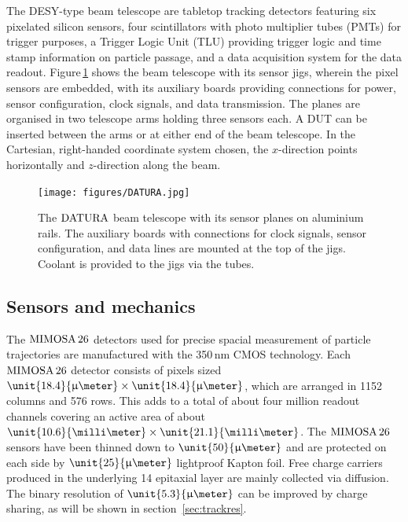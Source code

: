 
The DESY-type beam telescope are tabletop tracking detectors featuring six pixelated silicon sensors, four scintillators with photo multiplier tubes (PMTs) for trigger purposes,
 a Trigger Logic Unit (TLU) providing trigger logic and time stamp information on particle passage, and a data acquisition system for the data readout. 
Figure\,\ref{fig:datura-tscope} shows the beam telescope with its sensor jigs, wherein the pixel sensors are embedded, with its auxiliary boards providing connections for power,
 sensor configuration, clock signals, and data transmission. 
The planes are organised in two telescope arms holding three sensors each. 
A DUT can be inserted between the arms or at either end of the beam telescope. 
In the Cartesian, right-handed coordinate system chosen, the $x$-direction points horizontally and $z$-direction along the beam.

\begin{figure}[tb]
	\center
	\texttt{[image: figures/DATURA.jpg]}
	\caption[The $\Datura$ telescope]{The $\Datura$ beam telescope with its sensor planes on aluminium rails.
	The auxiliary boards with connections for clock signals, sensor configuration, and data lines are mounted at the top of the jigs.
	Coolant is provided to the jigs via the tubes.}
	\label{fig:datura-tscope}
\end{figure}
 
\subsection{Sensors and mechanics}
\label{sec:sensors}

The $\textrm{MIMOSA\,26}$ detectors used for precise spacial measurement of particle trajectories are manufactured with the 350\,nm CMOS technology. 
Each $\textrm{MIMOSA\,26}$ detector consists of pixels sized $\unit{18.4}{\upmu\meter} \times \unit{18.4}{\upmu\meter}$, which are arranged in 1152 columns and 576 rows.
This adds to a total of about four million readout channels covering an active area of about $\unit{10.6}{\milli\meter} \times \unit{21.1}{\milli\meter}$. 
The $\textrm{MIMOSA\,26}$ sensors have been thinned down to $\unit{50}{\upmu\meter}$ and are protected on each side by $\unit{25}{\upmu\meter}$ lightproof Kapton foil. 
Free charge carriers produced in the underlying \unit{14}{\upmu\meter} epitaxial layer are mainly collected via diffusion. 
The binary resolution of $\unit{5.3}{\upmu\meter}$ can be improved by charge sharing, as will be shown in section~\ref{sec:trackres}.


